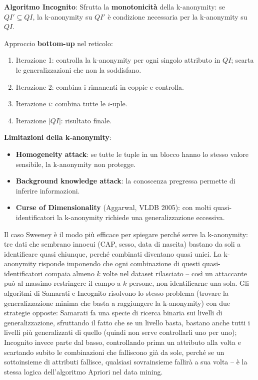 \documentclass[a4paper,11pt]{article}
\begin{document}
\textbf{Algoritmo Incognito}:
Sfrutta la \textbf{monotonicità} della k-anonymity: se $QI' \subseteq QI$, la k-anonymity su $QI'$ \`{e} condizione necessaria per la k-anonymity su $QI$.

Approccio \textbf{bottom-up} nel reticolo:
\begin{enumerate}
  \item Iterazione 1: controlla la k-anonymity per ogni singolo attributo in $QI$; scarta le generalizzazioni che non la soddisfano.
  \item Iterazione 2: combina i rimanenti in coppie e controlla.
  \item Iterazione $i$: combina tutte le $i$-uple.
  \item Iterazione $|QI|$: risultato finale.
\end{enumerate}

\textbf{Limitazioni della k-anonymity}:
\begin{itemize}
  \item \textbf{Homogeneity attack}: se tutte le tuple in un blocco hanno lo stesso valore sensibile, la k-anonymity non protegge.
  \item \textbf{Background knowledge attack}: la conoscenza pregressa permette di inferire informazioni.
  \item \textbf{Curse of Dimensionality} (Aggarwal, VLDB 2005): con molti quasi-identificatori la k-anonymity richiede una generalizzazione eccessiva.
\end{itemize}

\begin{nota}
Il caso Sweeney \`{e} il modo pi\`{u} efficace per spiegare perch\'{e} serve la k-anonymity: tre dati che sembrano innocui (CAP, sesso, data di nascita) bastano da soli a identificare quasi chiunque, perch\'{e} combinati diventano quasi unici. La k-anonymity risponde imponendo che ogni combinazione di questi quasi-identificatori compaia almeno $k$ volte nel dataset rilasciato -- cos\`{i} un attaccante pu\`{o} al massimo restringere il campo a $k$ persone, non identificarne una sola. Gli algoritmi di Samarati e Incognito risolvono lo stesso problema (trovare la generalizzazione minima che basta a raggiungere la k-anonymity) con due strategie opposte: Samarati fa una specie di ricerca binaria sui livelli di generalizzazione, sfruttando il fatto che se un livello basta, bastano anche tutti i livelli pi\`{u} generalizzati di quello (quindi non serve controllarli uno per uno); Incognito invece parte dal basso, controllando prima un attributo alla volta e scartando subito le combinazioni che falliscono gi\`{a} da sole, perch\'{e} se un sottoinsieme di attributi fallisce, qualsiasi sovrainsieme fallir\`{a} a sua volta -- \`{e} la stessa logica dell'algoritmo Apriori nel data mining.
\end{nota}
\end{document}
